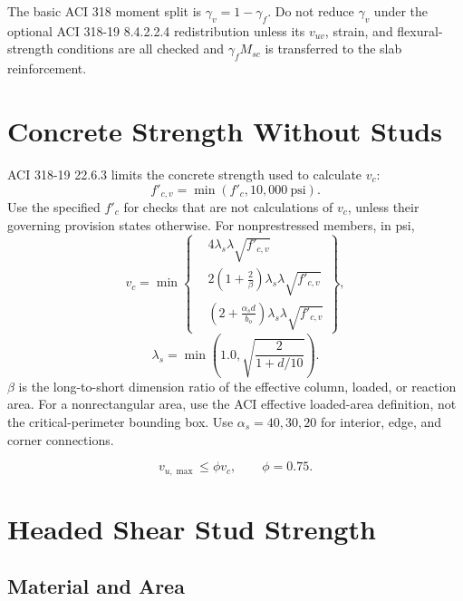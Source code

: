 \documentclass[10pt]{article}
\begin{document}
The basic ACI 318 moment split is $\gamma_v=1-\gamma_f$. Do not reduce
$\gamma_v$ under the optional ACI 318-19 8.4.2.2.4 redistribution unless its
$v_{uv}$, strain, and flexural-strength conditions are all checked and
$\gamma_fM_{sc}$ is transferred to the slab reinforcement.

\section{Concrete Strength Without Studs}

ACI 318-19 22.6.3 limits the concrete strength used to calculate $v_c$:
\begin{equation}
f'_{c,v}=\min(f'_c,10{,}000\ \mathrm{psi}).
\end{equation}
Use the specified $f'_c$ for checks that are not calculations of $v_c$, unless
their governing provision states otherwise. For nonprestressed members, in psi,
\begin{equation}
v_c=\min\!\left\{
\begin{aligned}
&4\lambda_s\lambda\sqrt{f'_{c,v}}\\
&2\left(1+\frac{2}{\beta}\right)\lambda_s\lambda\sqrt{f'_{c,v}}\\
&\left(2+\frac{\alpha_s d}{b_o}\right)
  \lambda_s\lambda\sqrt{f'_{c,v}}
\end{aligned}\right\},
\end{equation}
\begin{equation}
\lambda_s=\min\!\left(1.0,\sqrt{\frac{2}{1+d/10}}\right).
\end{equation}
$\beta$ is the long-to-short dimension ratio of the effective column, loaded,
or reaction area. For a nonrectangular area, use the ACI effective loaded-area
definition, not the critical-perimeter bounding box. Use
$\alpha_s=40,30,20$ for interior, edge, and corner connections.

\begin{equation}
\boxed{v_{u,\max}\leq\phi v_c},\qquad \phi=0.75.
\end{equation}

\section{Headed Shear Stud Strength}

\subsection{Material and Area}
\end{document}
